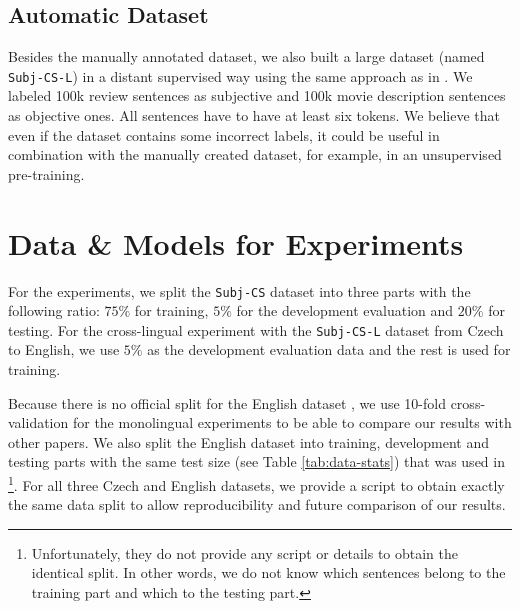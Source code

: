 \documentclass[10pt, a4paper]{article}
\begin{document}
\subsection{Automatic Dataset}
Besides the manually annotated dataset, we also built a large dataset (named \texttt{Subj-CS-L}) in a distant supervised way using the same approach as in \cite{english-dataset}. We labeled 100k review sentences as subjective and 100k movie description sentences as objective ones. All sentences have to have at least six tokens. We believe that even if the dataset contains some incorrect labels, it could be useful in combination with the manually created dataset, for example, in an unsupervised pre-training.



\section{Data \& Models for Experiments}
\label{sec:data-models}
For the experiments, we split the \texttt{Subj-CS} dataset into three parts with the following ratio: $75 \%$ for training, $5 \%$ for the development evaluation and $20 \%$ for testing.
For the cross-lingual experiment with the \texttt{Subj-CS-L} dataset from Czech to English, we use $5 \%$ as the development evaluation data and the rest is used for training.

\par Because there is no official split for the English dataset \cite{english-dataset}, we use 10-fold cross-validation for the monolingual experiments to be able to compare our results with other papers. We also split the English dataset into training, development and testing parts with the same test size (see Table \ref{tab:data-stats}) that was used in \cite{wang2021entailment-few-shot-learner}\footnote{Unfortunately, they do not provide any script or details to obtain the identical split. In other words, we do not know which sentences belong to the training part and which to the testing part.}. For all three Czech and English datasets, we provide a script to obtain exactly the same data split to allow reproducibility and future comparison of our results.
\end{document}

